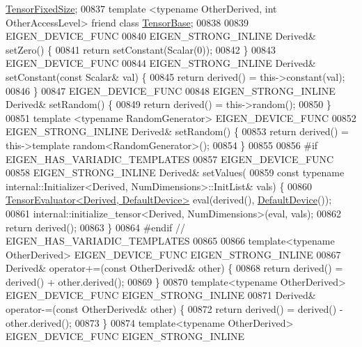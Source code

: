 \begin{DoxyCode}
      \hyperlink{class_eigen_1_1_tensor_fixed_size}{TensorFixedSize};
00837     \textcolor{keyword}{template} <\textcolor{keyword}{typename} OtherDerived, \textcolor{keywordtype}{int} OtherAccessLevel> \textcolor{keyword}{friend} \textcolor{keyword}{class }
      \hyperlink{class_eigen_1_1_tensor_base}{TensorBase};
00838 
00839     EIGEN\_DEVICE\_FUNC
00840     EIGEN\_STRONG\_INLINE Derived& setZero() \{
00841       \textcolor{keywordflow}{return} setConstant(Scalar(0));
00842     \}
00843     EIGEN\_DEVICE\_FUNC
00844     EIGEN\_STRONG\_INLINE Derived& setConstant(\textcolor{keyword}{const} Scalar& val) \{
00845       \textcolor{keywordflow}{return} derived() = this->constant(val);
00846     \}
00847     EIGEN\_DEVICE\_FUNC
00848     EIGEN\_STRONG\_INLINE Derived& setRandom() \{
00849       \textcolor{keywordflow}{return} derived() = this->random();
00850     \}
00851     \textcolor{keyword}{template} <\textcolor{keyword}{typename} RandomGenerator> EIGEN\_DEVICE\_FUNC
00852     EIGEN\_STRONG\_INLINE Derived& setRandom() \{
00853       \textcolor{keywordflow}{return} derived() = this->\textcolor{keyword}{template} random<RandomGenerator>();
00854     \}
00855 
00856 \textcolor{preprocessor}{#if EIGEN\_HAS\_VARIADIC\_TEMPLATES}
00857     EIGEN\_DEVICE\_FUNC
00858     EIGEN\_STRONG\_INLINE Derived& setValues(
00859         \textcolor{keyword}{const} \textcolor{keyword}{typename} internal::Initializer<Derived, NumDimensions>::InitList& vals) \{
00860       \hyperlink{struct_eigen_1_1_tensor_evaluator}{TensorEvaluator<Derived, DefaultDevice>} eval(derived(), 
      \hyperlink{struct_eigen_1_1_default_device}{DefaultDevice}());
00861       internal::initialize\_tensor<Derived, NumDimensions>(eval, vals);
00862       \textcolor{keywordflow}{return} derived();
00863     \}
00864 \textcolor{preprocessor}{#endif  // EIGEN\_HAS\_VARIADIC\_TEMPLATES}
00865 
00866     \textcolor{keyword}{template}<\textcolor{keyword}{typename} OtherDerived> EIGEN\_DEVICE\_FUNC EIGEN\_STRONG\_INLINE
00867     Derived& operator+=(\textcolor{keyword}{const} OtherDerived& other) \{
00868       \textcolor{keywordflow}{return} derived() = derived() + other.derived();
00869     \}
00870     \textcolor{keyword}{template}<\textcolor{keyword}{typename} OtherDerived> EIGEN\_DEVICE\_FUNC EIGEN\_STRONG\_INLINE
00871     Derived& operator-=(\textcolor{keyword}{const} OtherDerived& other) \{
00872       \textcolor{keywordflow}{return} derived() = derived() - other.derived();
00873     \}
00874     \textcolor{keyword}{template}<\textcolor{keyword}{typename} OtherDerived> EIGEN\_DEVICE\_FUNC EIGEN\_STRONG\_INLINE

\end{DoxyCode}
